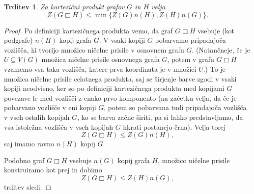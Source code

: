 \documentclass[12pt,a4paper,twoside]{article}
\theoremstyle{definition} %
\theoremstyle{plain} %
\newtheorem{trditev}[definicija]{Trditev}
\numberwithin{equation}{section}  %
\DeclareMathOperator{\boxempty}{\Box}
\begin{document}
\begin{trditev}
    \label{trd:kartezicni-produkt-zgornja-meja}
    Za kartezični produkt grafov $G$ in $H$ velja
    \begin{equation}
        Z(G \boxempty H) \leq \min\{Z(G) n(H), Z(H) n(G) \}.
        \label{eq:kartezicni-produkt-zgornja-meja}
    \end{equation}
\end{trditev}
\begin{proof}
    Po definiciji kartezičnega produkta vemo, da graf $G \boxempty H$ vsebuje (kot podgrafe) $n(H)$ kopij grafa $G$. V vsaki kopiji $G$ pobarvamo pripadajoča vozlišča, ki tvorijo množico ničelne prisile v osnovnem grafu $G$. (Natančneje, če je $U \subseteq V(G)$ množica ničelne prisile osnovnega grafa $G$, potem v grafu $G \boxempty H$ vzamemo vsa taka vozlišča, katere prva koordinata je v množici $U$.) To je množica ničelne prisile celotnega produkta, saj se širjenje barve zgodi v vsaki kopiji neodvisno, ker so po definiciji kartezičnega produkta med kopijami $G$ povezave le med vozlišči z enako prvo komponento (na začetku velja, da če je pobarvano vozlišče v eni kopiji $G$, potem so pobarvana tudi pripadajoča vozlišča v vseh ostalih kopijah $G$, ko se barva začne širiti, pa si lahko predstavljamo, da vsa istoležna vozlišča v vseh kopijah $G$ hkrati postanejo črna). Velja torej
    \[ Z(G \boxempty H) \leq Z(G) n(H), \]
    saj imamo ravno $n(H)$ kopij $G$.
    
    Podobno graf $G \boxempty H$ vsebuje $n(G)$ kopij grafa $H$, množico ničelne prisile konstruiramo kot prej in dobimo
    \[ Z(G \boxempty H)  \leq Z(H) n(G), \]
    trditev sledi.
\end{proof}
\end{document}
